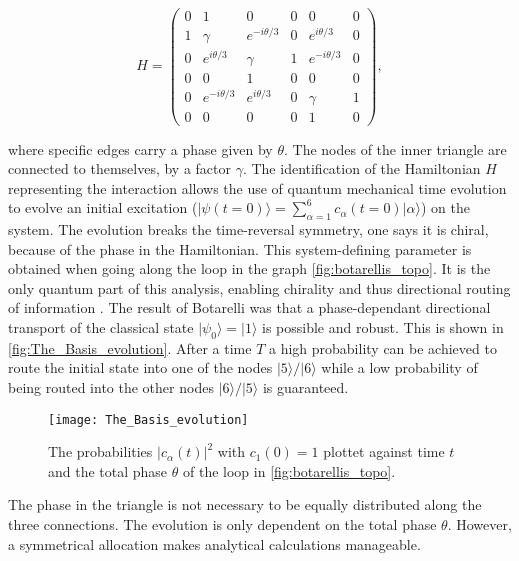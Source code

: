 \begin{equation} \label{eq:Bot_Hamilton}
H
=
\begin{pmatrix}
0 & 1 & 0 & 0 & 0 & 0 \\
1 & \gamma & e^{-i \theta / 3} & 0 & e^{i \theta / 3} & 0 \\
0 & e^{i \theta / 3} & \gamma & 1 & e^{-i \theta / 3} & 0 \\
0 & 0 & 1 & 0 & 0 & 0 \\
0 & e^{-i \theta / 3} & e^{i \theta / 3} & 0 & \gamma & 1 \\
0 & 0 & 0 & 0 & 1 & 0
\end{pmatrix},
\end{equation}

\noindent
where specific edges carry a phase given by $\theta$.
The nodes of the inner triangle are connected to themselves, by a factor $ \gamma $.
The identification of the Hamiltonian $ H $
representing the interaction allows the use of quantum mechanical time evolution
to evolve an initial excitation
($\vert \psi (t = 0) \rangle = \sum_{\alpha = 1}^{6} c_\alpha(t = 0) \vert \alpha \rangle $) on the system.
The evolution breaks the time-reversal symmetry, one says it is chiral, because of the phase in the Hamiltonian.
This system-defining parameter is obtained when going along the loop in the graph \autoref{fig:botarellis_topo}.
It is the only quantum part of this analysis, enabling chirality and thus directional routing of information \cite{Ann_Springer, Shu2024}.
The result of Botarelli was that a phase-dependant directional transport of the classical state $\vert \psi_0 \rangle = \vert 1 \rangle $ is possible and robust.
This is shown in \autoref{fig:The_Basis_evolution}.
After a time $T$ a high probability can be achieved to route the initial state into one of the nodes
$ \vert 5 \rangle / \vert 6 \rangle$ while a low probability of being routed into the other nodes $\vert 6 \rangle / \vert 5 \rangle $ is guaranteed.

\begin{figure}[!ht]
    \centering
    \texttt{[image: The\_Basis\_evolution]}
    \caption{The probabilities $ |c_\alpha(t) |^2 $ with $ c_1(0) = 1 $  plottet against time $t$ and the total phase $\theta$ of the loop in \autoref{fig:botarellis_topo}.}
    \label{fig:The_Basis_evolution}
\end{figure}

\noindent
The phase in the triangle is not necessary to be equally distributed along the three connections.
The evolution is only dependent on the total phase $ \theta $.
However, a symmetrical allocation makes analytical calculations manageable.

